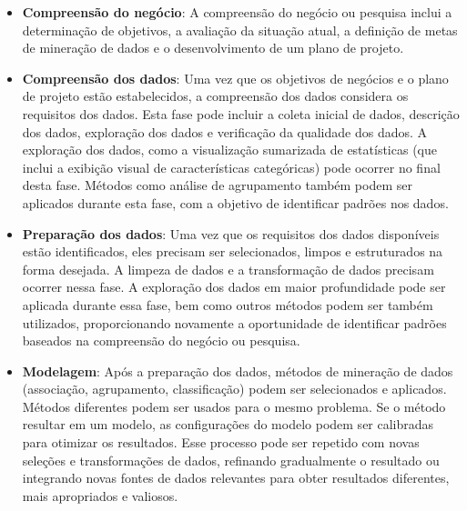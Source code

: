 \begin{itemize}
  \item 
\textbf{Compreensão do negócio}: A compreensão do negócio ou pesquisa inclui a determinação de objetivos, a avaliação da situação atual, a definição de metas de mineração de dados e o desenvolvimento de um plano de projeto.
  \item
\textbf{Compreensão dos dados}: Uma vez que os objetivos de negócios e o plano de projeto estão estabelecidos, a compreensão dos dados considera os requisitos dos dados. Esta fase pode incluir a coleta inicial de dados, descrição dos dados, exploração dos dados e verificação da qualidade dos dados. A exploração dos dados, como a visualização sumarizada de estatísticas (que inclui a exibição visual de características categóricas) pode ocorrer no final desta fase. Métodos como análise de agrupamento também podem ser aplicados durante esta fase, com a objetivo de identificar padrões nos dados.
  \item
\textbf{Preparação dos dados}: Uma vez que os requisitos dos dados disponíveis estão identificados, eles precisam ser selecionados, limpos e estruturados na forma desejada. A limpeza de dados e a transformação de dados precisam ocorrer nessa fase. A exploração dos dados em maior profundidade pode ser aplicada durante essa fase, bem como outros métodos podem ser também utilizados, proporcionando novamente a oportunidade de identificar padrões baseados na compreensão do negócio ou pesquisa.
  \item
\textbf{Modelagem}: Após a preparação dos dados, métodos de mineração de dados (associação, agrupamento,  classificação) podem ser selecionados e aplicados. Métodos diferentes podem ser usados para o mesmo problema. Se o método resultar em um modelo, as configurações do modelo podem ser calibradas para otimizar os resultados. Esse processo pode ser repetido com novas seleções e transformações de dados, refinando gradualmente o resultado ou integrando novas fontes de dados relevantes para obter resultados diferentes, mais apropriados e valiosos.


\end{itemize}
